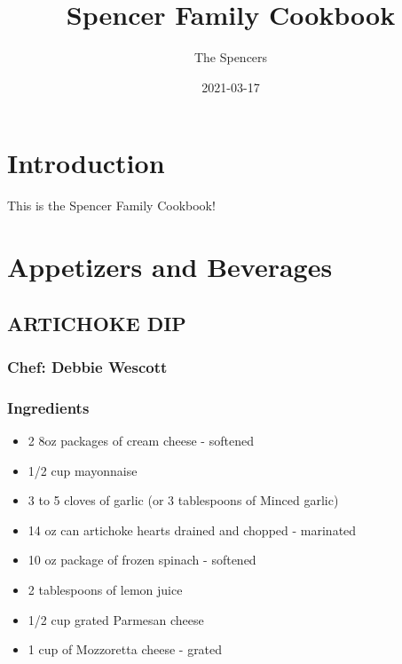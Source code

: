 \documentclass[
]{book}
\title{Spencer Family Cookbook}
\author{The Spencers}
\date{2021-03-17}
\providecommand{\tightlist}{%
  \setlength{\itemsep}{0pt}\setlength{\parskip}{0pt}}
\begin{document}
\maketitle

{
\setcounter{tocdepth}{1}
\tableofcontents
}
\hypertarget{introduction}{%
\chapter{Introduction}\label{introduction}}

This is the Spencer Family Cookbook!

\hypertarget{appetizers}{%
\chapter{Appetizers and Beverages}\label{appetizers}}

\hypertarget{artichoke-dip}{%
\section*{ARTICHOKE DIP}\label{artichoke-dip}}

\hypertarget{chef-debbie-wescott}{%
\subsection*{Chef: Debbie Wescott}\label{chef-debbie-wescott}}

\hypertarget{ingredients}{%
\subsection*{Ingredients}\label{ingredients}}

\begin{itemize}
\tightlist
\item
  2 8oz packages of cream cheese - softened
\item
  1/2 cup mayonnaise
\item
  3 to 5 cloves of garlic (or 3 tablespoons of Minced garlic)
\item
  14 oz can artichoke hearts drained and chopped - marinated
\item
  10 oz package of frozen spinach - softened
\item
  2 tablespoons of lemon juice
\item
  1/2 cup grated Parmesan cheese
\item
  1 cup of Mozzoretta cheese - grated
\end{itemize}
\end{document}
